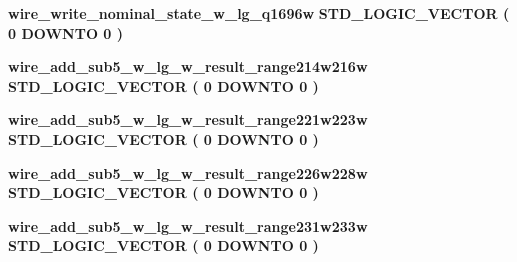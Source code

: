 \begin{DoxyCompactItemize}
\item 
{\bf wire\+\_\+write\+\_\+nominal\+\_\+state\+\_\+w\+\_\+lg\+\_\+q1696w} {\bfseries \textcolor{comment}{S\+T\+D\+\_\+\+L\+O\+G\+I\+C\+\_\+\+V\+E\+C\+T\+OR}\textcolor{vhdlchar}{ }\textcolor{vhdlchar}{(}\textcolor{vhdlchar}{ }\textcolor{vhdlchar}{ } \textcolor{vhdldigit}{0} \textcolor{vhdlchar}{ }\textcolor{keywordflow}{D\+O\+W\+N\+TO}\textcolor{vhdlchar}{ }\textcolor{vhdlchar}{ } \textcolor{vhdldigit}{0} \textcolor{vhdlchar}{ }\textcolor{vhdlchar}{)}\textcolor{vhdlchar}{ }} 
\item 
{\bf wire\+\_\+add\+\_\+sub5\+\_\+w\+\_\+lg\+\_\+w\+\_\+result\+\_\+range214w216w} {\bfseries \textcolor{comment}{S\+T\+D\+\_\+\+L\+O\+G\+I\+C\+\_\+\+V\+E\+C\+T\+OR}\textcolor{vhdlchar}{ }\textcolor{vhdlchar}{(}\textcolor{vhdlchar}{ }\textcolor{vhdlchar}{ } \textcolor{vhdldigit}{0} \textcolor{vhdlchar}{ }\textcolor{keywordflow}{D\+O\+W\+N\+TO}\textcolor{vhdlchar}{ }\textcolor{vhdlchar}{ } \textcolor{vhdldigit}{0} \textcolor{vhdlchar}{ }\textcolor{vhdlchar}{)}\textcolor{vhdlchar}{ }} 
\item 
{\bf wire\+\_\+add\+\_\+sub5\+\_\+w\+\_\+lg\+\_\+w\+\_\+result\+\_\+range221w223w} {\bfseries \textcolor{comment}{S\+T\+D\+\_\+\+L\+O\+G\+I\+C\+\_\+\+V\+E\+C\+T\+OR}\textcolor{vhdlchar}{ }\textcolor{vhdlchar}{(}\textcolor{vhdlchar}{ }\textcolor{vhdlchar}{ } \textcolor{vhdldigit}{0} \textcolor{vhdlchar}{ }\textcolor{keywordflow}{D\+O\+W\+N\+TO}\textcolor{vhdlchar}{ }\textcolor{vhdlchar}{ } \textcolor{vhdldigit}{0} \textcolor{vhdlchar}{ }\textcolor{vhdlchar}{)}\textcolor{vhdlchar}{ }} 
\item 
{\bf wire\+\_\+add\+\_\+sub5\+\_\+w\+\_\+lg\+\_\+w\+\_\+result\+\_\+range226w228w} {\bfseries \textcolor{comment}{S\+T\+D\+\_\+\+L\+O\+G\+I\+C\+\_\+\+V\+E\+C\+T\+OR}\textcolor{vhdlchar}{ }\textcolor{vhdlchar}{(}\textcolor{vhdlchar}{ }\textcolor{vhdlchar}{ } \textcolor{vhdldigit}{0} \textcolor{vhdlchar}{ }\textcolor{keywordflow}{D\+O\+W\+N\+TO}\textcolor{vhdlchar}{ }\textcolor{vhdlchar}{ } \textcolor{vhdldigit}{0} \textcolor{vhdlchar}{ }\textcolor{vhdlchar}{)}\textcolor{vhdlchar}{ }} 
\item 
{\bf wire\+\_\+add\+\_\+sub5\+\_\+w\+\_\+lg\+\_\+w\+\_\+result\+\_\+range231w233w} {\bfseries \textcolor{comment}{S\+T\+D\+\_\+\+L\+O\+G\+I\+C\+\_\+\+V\+E\+C\+T\+OR}\textcolor{vhdlchar}{ }\textcolor{vhdlchar}{(}\textcolor{vhdlchar}{ }\textcolor{vhdlchar}{ } \textcolor{vhdldigit}{0} \textcolor{vhdlchar}{ }\textcolor{keywordflow}{D\+O\+W\+N\+TO}\textcolor{vhdlchar}{ }\textcolor{vhdlchar}{ } \textcolor{vhdldigit}{0} \textcolor{vhdlchar}{ }\textcolor{vhdlchar}{)}\textcolor{vhdlchar}{ }} 

\end{DoxyCompactItemize}
